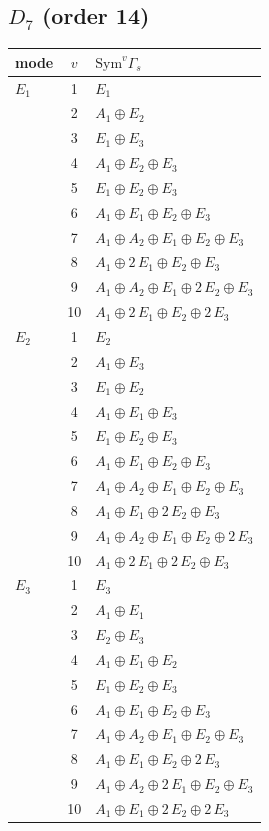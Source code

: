 \documentclass[11pt]{article}
\begin{document}
\subsection*{$D_{7}$ \quad (order 14)}
\begin{longtable}{l c p{}}
\hline mode & $v$ & $\mathrm{Sym}^v\Gamma_s$\\ \hline\endhead
$E_{1}$ & 1 & $E_{1}$\\
 & 2 & $A_{1}\oplus E_{2}$\\
 & 3 & $E_{1}\oplus E_{3}$\\
 & 4 & $A_{1}\oplus E_{2}\oplus E_{3}$\\
 & 5 & $E_{1}\oplus E_{2}\oplus E_{3}$\\
 & 6 & $A_{1}\oplus E_{1}\oplus E_{2}\oplus E_{3}$\\
 & 7 & $A_{1}\oplus A_{2}\oplus E_{1}\oplus E_{2}\oplus E_{3}$\\
 & 8 & $A_{1}\oplus 2\,E_{1}\oplus E_{2}\oplus E_{3}$\\
 & 9 & $A_{1}\oplus A_{2}\oplus E_{1}\oplus 2\,E_{2}\oplus E_{3}$\\
 & 10 & $A_{1}\oplus 2\,E_{1}\oplus E_{2}\oplus 2\,E_{3}$\\
\hline
$E_{2}$ & 1 & $E_{2}$\\
 & 2 & $A_{1}\oplus E_{3}$\\
 & 3 & $E_{1}\oplus E_{2}$\\
 & 4 & $A_{1}\oplus E_{1}\oplus E_{3}$\\
 & 5 & $E_{1}\oplus E_{2}\oplus E_{3}$\\
 & 6 & $A_{1}\oplus E_{1}\oplus E_{2}\oplus E_{3}$\\
 & 7 & $A_{1}\oplus A_{2}\oplus E_{1}\oplus E_{2}\oplus E_{3}$\\
 & 8 & $A_{1}\oplus E_{1}\oplus 2\,E_{2}\oplus E_{3}$\\
 & 9 & $A_{1}\oplus A_{2}\oplus E_{1}\oplus E_{2}\oplus 2\,E_{3}$\\
 & 10 & $A_{1}\oplus 2\,E_{1}\oplus 2\,E_{2}\oplus E_{3}$\\
\hline
$E_{3}$ & 1 & $E_{3}$\\
 & 2 & $A_{1}\oplus E_{1}$\\
 & 3 & $E_{2}\oplus E_{3}$\\
 & 4 & $A_{1}\oplus E_{1}\oplus E_{2}$\\
 & 5 & $E_{1}\oplus E_{2}\oplus E_{3}$\\
 & 6 & $A_{1}\oplus E_{1}\oplus E_{2}\oplus E_{3}$\\
 & 7 & $A_{1}\oplus A_{2}\oplus E_{1}\oplus E_{2}\oplus E_{3}$\\
 & 8 & $A_{1}\oplus E_{1}\oplus E_{2}\oplus 2\,E_{3}$\\
 & 9 & $A_{1}\oplus A_{2}\oplus 2\,E_{1}\oplus E_{2}\oplus E_{3}$\\
 & 10 & $A_{1}\oplus E_{1}\oplus 2\,E_{2}\oplus 2\,E_{3}$\\
\hline
\end{longtable}
\end{document}
